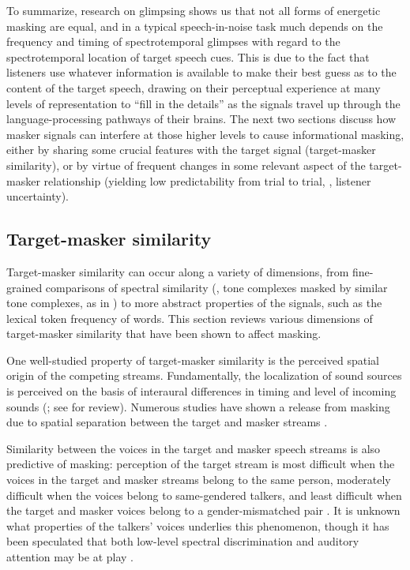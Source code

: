To summarize, research on glimpsing shows us that not all forms of energetic masking are equal, and in a typical speech-in-noise task much depends on the frequency and timing of spectrotemporal glimpses with regard to the spectrotemporal location of target speech cues.  This is due to the fact that listeners use whatever information is available to make their best guess as to the content of the target speech, drawing on their perceptual experience at many levels of representation to “fill in the details” as the signals travel up through the language-processing pathways of their brains.  The next two sections discuss how masker signals can interfere at those higher levels to cause informational masking, either by sharing some crucial features with the target signal (target-masker similarity), or by virtue of frequent changes in some relevant aspect of the target-masker relationship (yielding low predictability from trial to trial, \ie, listener uncertainty).

\subsection{Target-masker similarity\label{sec:Similarity}}
Target-masker similarity can occur along a variety of dimensions, from fine-grained comparisons of spectral similarity (\eg, tone complexes masked by similar tone complexes, as in \citealt{LeeRichards2011}) to more abstract properties of the signals, such as the lexical token frequency of words.  This section reviews various dimensions of target-masker similarity that have been shown to affect masking.

One well-studied property of target-masker similarity is the perceived spatial origin of the competing streams.  Fundamentally, the localization of sound sources is perceived on the basis of interaural differences in timing and level of incoming sounds (\citealp[\eg][]{Kock1950, Hirsh1950}; see \citealp{Darwin2008} for review).  Numerous studies have shown a release from masking due to spatial separation between the target and masker streams \citep[\eg][]{CarhartEtAl1968, FreymanEtAl1999, BrungartSimpson2002, FreymanEtAl2004, GallunEtAl2005, KiddEtAl2005a, JohnstoneLitovsky2006}.  

Similarity between the voices in the target and masker speech streams is also predictive of masking: perception of the target stream is most difficult when the voices in the target and masker streams belong to the same person, moderately difficult when the voices belong to same-gendered talkers, and least difficult when the target and masker voices belong to a gender-mismatched pair \citet{Brungart2001}.  It is unknown what properties of the talkers’ voices underlies this phenomenon, though it has been speculated that both low-level spectral discrimination and auditory attention may be at play \citep{HelferFreyman2008}.

